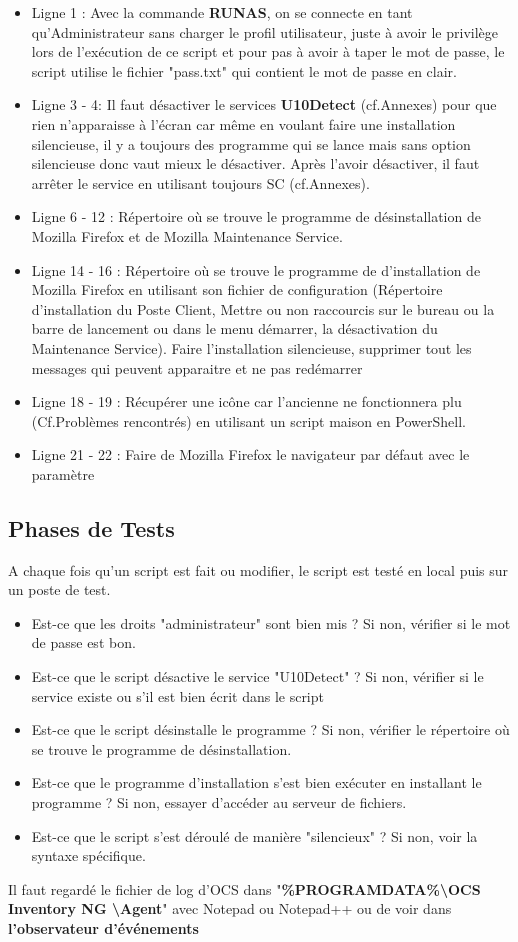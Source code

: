 \documentclass[11pt,a4paper,oneside]{article}
\begin{document}
\begin{itemize}
	\item Ligne 1 : Avec la commande \textbf{RUNAS}, on se connecte en tant qu'Administrateur sans charger le profil utilisateur, juste à avoir le privilège lors de l'exécution de ce script et pour pas à avoir à taper le mot de passe, le script utilise le fichier "pass.txt" qui contient le mot de passe en clair.
	\item Ligne 3 - 4: Il faut désactiver le services \textbf{U10Detect} (cf.Annexes) pour que rien n'apparaisse à l'écran car  même en voulant faire une installation silencieuse, il y a toujours des programme qui se lance mais sans option silencieuse donc vaut mieux le désactiver. Après l'avoir désactiver, il faut arrêter le service en utilisant toujours SC (cf.Annexes). 
	\item Ligne 6 - 12 : Répertoire où se trouve le programme de désinstallation de Mozilla Firefox et de Mozilla Maintenance Service.
	\item Ligne 14 - 16 : Répertoire où se trouve le programme de d'installation de Mozilla Firefox en utilisant son fichier de configuration (Répertoire d'installation du Poste Client, Mettre ou non raccourcis sur le bureau ou la barre de lancement ou dans le menu démarrer, la désactivation du Maintenance Service). Faire l'installation silencieuse, supprimer tout les messages qui peuvent apparaitre et ne pas redémarrer
	\item Ligne 18 - 19 : Récupérer une icône car l'ancienne ne fonctionnera plu (Cf.Problèmes rencontrés) en utilisant un script maison en PowerShell.
	\item Ligne 21 - 22 : Faire de Mozilla Firefox le navigateur par défaut avec le paramètre
\end{itemize}
\newpage
\subsection{Phases de Tests}
A chaque fois qu'un script est fait ou modifier, le script est testé en local puis sur un poste de test.\\
\begin{itemize} 
	\item Est-ce que les droits "administrateur" sont bien mis ? Si non, vérifier si le mot de passe est bon. 
	\item Est-ce que le script désactive le service "U10Detect" ? Si non, vérifier si le service existe ou s'il est bien écrit dans le script
	\item Est-ce que le script désinstalle le programme ? Si non, vérifier le répertoire où se trouve le programme de désinstallation.
	\item Est-ce que le programme d'installation s'est bien exécuter en installant le programme ? Si non, essayer d'accéder au serveur de fichiers.
	\item Est-ce que le script s'est déroulé de manière "silencieux" ? Si non, voir la syntaxe spécifique. \\
\end{itemize}
Il faut regardé le fichier de log d'OCS dans "\textbf{\%PROGRAMDATA\%\textbackslash OCS Inventory NG \textbackslash Agent}" avec Notepad ou Notepad++ ou de voir dans \textbf{l'observateur d'événements}
\end{document}
